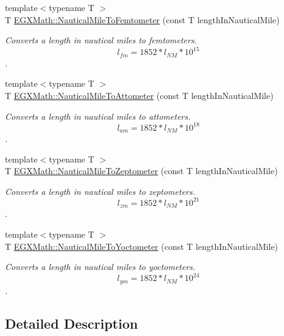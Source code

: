 \begin{DoxyCompactItemize}
{\footnotesize template$<$typename T $>$ }\\T \mbox{\hyperlink{group___e_g_x_math-_conversions-_length_conversions-_non-_s_i-_nautical_mile-_s_i_gacb38ddd47f497e26e3f0dcc8d32cca85}{E\+G\+X\+Math\+::\+Nautical\+Mile\+To\+Femtometer}} (const T length\+In\+Nautical\+Mile)
\begin{DoxyCompactList}\small\item\em Converts a length in nautical miles to femtometers. \[ l_{fm}=1852 * l_{NM} * 10^{15} \]. \end{DoxyCompactList}\item 
{\footnotesize template$<$typename T $>$ }\\T \mbox{\hyperlink{group___e_g_x_math-_conversions-_length_conversions-_non-_s_i-_nautical_mile-_s_i_ga18a7668c4fb069dd5955fd010bff4db5}{E\+G\+X\+Math\+::\+Nautical\+Mile\+To\+Attometer}} (const T length\+In\+Nautical\+Mile)
\begin{DoxyCompactList}\small\item\em Converts a length in nautical miles to attometers. \[ l_{am}=1852 * l_{NM} * 10^{18} \]. \end{DoxyCompactList}\item 
{\footnotesize template$<$typename T $>$ }\\T \mbox{\hyperlink{group___e_g_x_math-_conversions-_length_conversions-_non-_s_i-_nautical_mile-_s_i_ga58ac712a2ae63b010c8480d380f2a7c6}{E\+G\+X\+Math\+::\+Nautical\+Mile\+To\+Zeptometer}} (const T length\+In\+Nautical\+Mile)
\begin{DoxyCompactList}\small\item\em Converts a length in nautical miles to zeptometers. \[ l_{zm}=1852 * l_{NM} * 10^{21} \]. \end{DoxyCompactList}\item 
{\footnotesize template$<$typename T $>$ }\\T \mbox{\hyperlink{group___e_g_x_math-_conversions-_length_conversions-_non-_s_i-_nautical_mile-_s_i_ga88c9ac99418bf78c790532bd414d0a89}{E\+G\+X\+Math\+::\+Nautical\+Mile\+To\+Yoctometer}} (const T length\+In\+Nautical\+Mile)
\begin{DoxyCompactList}\small\item\em Converts a length in nautical miles to yoctometers. \[ l_{ym}=1852 * l_{NM} * 10^{24} \]. \end{DoxyCompactList}\end{DoxyCompactItemize}


\subsection{Detailed Description}



